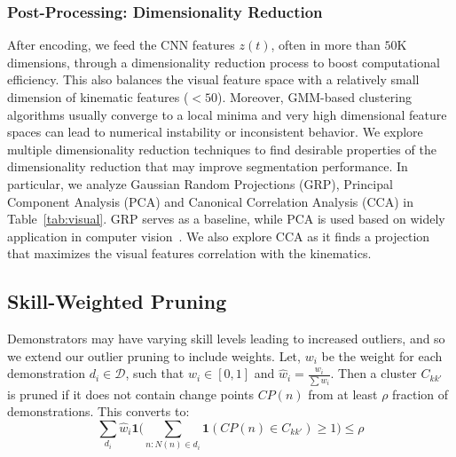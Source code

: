 \documentclass[0-main.tex]{subfiles}
\begin{document}
\subsubsection{Post-Processing: Dimensionality Reduction}
After encoding, we feed the CNN features $z(t)$, often in more than $50$K dimensions, through a dimensionality reduction process to boost computational efficiency. This also balances the visual feature space with a relatively small dimension of kinematic features ($<50$).
Moreover, GMM-based clustering algorithms usually converge to a local minima and very high dimensional feature spaces can lead to numerical instability or inconsistent behavior.
We explore multiple dimensionality reduction techniques to find desirable properties of the dimensionality reduction that may improve segmentation performance.
In particular, we analyze Gaussian Random Projections (GRP), Principal Component Analysis (PCA) and Canonical Correlation Analysis (CCA) in Table~\ref{tab:visual}. GRP serves as a baseline, while PCA is used based on widely application in computer vision~\cite{xu2014discriminative}. We also explore CCA as it finds a projection that maximizes the visual features correlation with the kinematics. 


\subsection{Skill-Weighted Pruning} 
Demonstrators may have varying skill levels leading to increased outliers, and so we extend our outlier pruning to include weights.
Let, $w_i$ be the weight for each demonstration $d_i \in \mathcal{D}$, such that $w_i \in [0,1]$ and $\hat{w}_i = \frac{w_i}{\sum w_i}$. Then a cluster $C_{kk'}$ is pruned if it does not contain change points $CP(n)$ from at least $\rho$ fraction of demonstrations. This converts to:
\vspace{-3pt}
\[\sum_{d_i} \hat{w}_i\mathbf{1}\Big( \sum_{n:N(n)\in d_i} \mathbf{1}( CP(n) \in C_{kk'}) \geq 1 \Big) \leq \rho 
\]
\vspace{-5pt}


\end{document}
